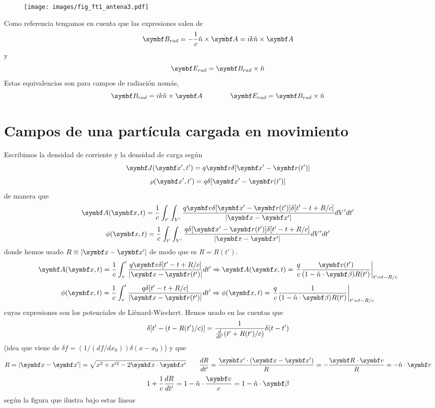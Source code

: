 \documentclass[10pt,oneside]{CBFT_book}
\begin{document}
\begin{figure}[htb]
	\begin{center}
	\texttt{[image: images/fig\_ft1\_antena3.pdf]}	 
	\end{center}
	\caption{}
\end{figure} 


Como referencia tengamos en cuenta que las expresiones salen de 
\[
	\vb{B}_{rad} = -\frac{1}{c} \hat{n} \times \dot{\vb{A}} = ik \hat{n} \times \vb{A} 
\]
y
\[
	\vb{E}_{rad} = \vb{B}_{rad} \times \hat{n}
\]
Estas equivalencias son para campos de radiación nomás,
\[
	\vb{B}_{rad} = ik \hat{n} \times \vb{A} \qquad \qquad \vb{E}_{rad} = \vb{B}_{rad} \times \hat{n}
\]

\section{Campos de una partícula cargada en movimiento}

Escribimos la densidad de corriente y la densidad de carga según
\[
	\vb{J}(\vb{x}',t') = q\vb{v} \delta[ \vb{x}' - \vb{r}(t')]
\]
\[
	\rho(\vb{x}',t') = q \delta[ \vb{x}' - \vb{r}(t')]
\]
de manera que 
\[
	\vb{A}(\vb{x},t) = \frac{1}{c} \int_{t'}\int_{V'} 
	\frac{ q\vb{v} \delta[ \vb{x}' - \vb{r}(t')] \delta[ t'-t +R/c] }{|\vb{x} -\vb{x}'|} dV' dt'
\]
\[
	\phi(\vb{x},t) = \frac{1}{c} \int_{t'}\int_{V'} 
	\frac{ q \delta[ \vb{x}' - \vb{r}(t')] \delta[ t'-t +R/c] }{|\vb{x} -\vb{x}'|} dV' dt'
\]
donde hemos usado $R\equiv |\vb{x}-\vb{x}'|$ de modo que es $R = R(t')$.
\[
	\vb{A}(\vb{x},t) = \frac{1}{c} \int_v' \frac{ q\vb{v} \delta[ t'-t +R/c] }{|\vb{x} -\vb{r}(t')|} dt' 
	\Rightarrow \vb{A}(\vb{x},t) = \left. \frac{q}{c} \frac{\vb{v}(t')}
	{(1-\hat{n}\cdot{\vb{\beta}})R(t')} \right|_{t'=t-R/c}
\]
\[
	\phi(\vb{x},t) = \frac{1}{c} \int_v' \frac{q \delta[ t'-t +R/c]}{|\vb{x} -\vb{r}(t')|} dt' 
	\Rightarrow \phi(\vb{x},t) = \left. \frac{q}{c} \frac{1}{(1-\hat{n}\cdot{\vb{\beta}})R(t')} 
	\right|_{t'=t-R/c}
\]
cuyas expresiones son los potenciales de Liènard-Wiechert. Hemos usado en las cuentas que 
\[
	\delta[t' - ( t - R(t')/c )] = \frac{1}{\frac{d^{\hspace{-0.05em}} {}}{d {t'}^{\hspace{-0.05em}}}( t' + R(t')/c )} \delta( t-t')
\]
(idea que viene de $\delta f = (1/(df/dx_0)) \delta(x-x_0) $) y que 
\[
	R = |\vb{x}-\vb{x}'| = \sqrt{ x^2 + x'^2 - 2\pe{x}{x'} } \qquad \dtot{R}{t'} = 
	\frac{\dot{\vb{x}'}\cdot(\vb{x}-\vb{x}')}{R} = -\frac{\pe{R}{v}}{R} = -\hat{n}\cdot\vb{v}
\]
\[
	1 + \frac{1}{c} \dtot{R}{t'}  = 1 -\hat{n}\cdot\frac{\vb{v}}{c} = 1 - \hat{n}\cdot\vb{\beta}
\]
según la figura que ilustra bajo estas líneas
\end{document}
